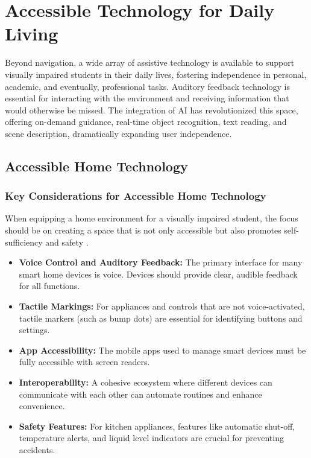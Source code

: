 \section{Accessible Technology for Daily Living}\label{ch8:sec:accessible-tech-daily-living}

Beyond navigation, a wide array of assistive technology is available to support visually impaired students in their daily lives, fostering independence in personal, academic, and eventually, professional tasks. Auditory feedback technology is essential for interacting with the environment and receiving information that would otherwise be missed. The integration of AI has revolutionized this space, offering on-demand guidance, real-time object recognition, text reading, and scene description, dramatically expanding user independence.

\subsection{Accessible Home Technology}

\subsubsection{Key Considerations for Accessible Home Technology}
When equipping a home environment for a visually impaired student, the focus should be on creating a space that is not only accessible but also promotes self-sufficiency and safety \supercite{AllAboutVision2023}.

\begin{itemize}
	\item \textbf{Voice Control and Auditory Feedback:} The primary interface for many smart home devices is voice. Devices should provide clear, audible feedback for all functions.
	\item \textbf{Tactile Markings:} For appliances and controls that are not voice-activated, tactile markers (such as bump dots) are essential for identifying buttons and settings.
	\item \textbf{App Accessibility:} The mobile apps used to manage smart devices must be fully accessible with screen readers.
	\item \textbf{Interoperability:} A cohesive ecosystem where different devices can communicate with each other can automate routines and enhance convenience.
	\item \textbf{Safety Features:} For kitchen appliances, features like automatic shut-off, temperature alerts, and liquid level indicators are crucial for preventing accidents.
\end{itemize}

